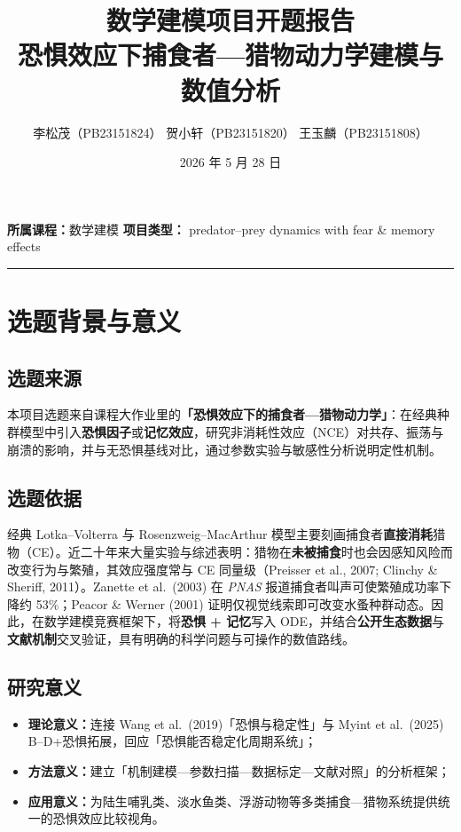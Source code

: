 \documentclass[12pt,a4paper]{ctexart}
\title{\textbf{数学建模项目开题报告}\\[0.4em]
\large 恐惧效应下捕食者—猎物动力学建模与数值分析}
\author{%
  李松茂（PB23151824）\quad
  贺小轩（PB23151820）\quad
  王玉麟（PB23151808）%
}
\date{2026 年 5 月 28 日}
\begin{document}
\maketitle

\begin{center}
\small
\textbf{所属课程：}数学建模 \quad
\textbf{项目类型：} predator--prey dynamics with fear \& memory effects
\end{center}

\vspace{0.5em}
\hrule
\vspace{1em}

\section{选题背景与意义}

\subsection{选题来源}

本项目选题来自课程大作业里的\textbf{「恐惧效应下的捕食者—猎物动力学」}：在经典种群模型中引入\textbf{恐惧因子}或\textbf{记忆效应}，研究非消耗性效应（NCE）对共存、振荡与崩溃的影响，并与无恐惧基线对比，通过参数实验与敏感性分析说明定性机制。

\subsection{选题依据}

经典 Lotka--Volterra 与 Rosenzweig--MacArthur 模型主要刻画捕食者\textbf{直接消耗}猎物（CE）。近二十年来大量实验与综述表明：猎物在\textbf{未被捕食}时也会因感知风险而改变行为与繁殖，其效应强度常与 CE 同量级（Preisser et al., 2007; Clinchy \& Sheriff, 2011）。Zanette et al.\ (2003) 在 \emph{PNAS} 报道捕食者叫声可使繁殖成功率下降约 53\%；Peacor \& Werner (2001) 证明仅视觉线索即可改变水蚤种群动态。因此，在数学建模竞赛框架下，将\textbf{恐惧 + 记忆}写入 ODE，并结合\textbf{公开生态数据}与\textbf{文献机制}交叉验证，具有明确的科学问题与可操作的数值路线。

\subsection{研究意义}

\begin{itemize}[leftmargin=2em]
  \item \textbf{理论意义：}连接 Wang et al.\ (2019)「恐惧与稳定性」与 Myint et al.\ (2025) B--D+恐惧拓展，回应「恐惧能否稳定化周期系统」；
  \item \textbf{方法意义：}建立「机制建模—参数扫描—数据标定—文献对照」的分析框架；
  \item \textbf{应用意义：}为陆生哺乳类、淡水鱼类、浮游动物等多类捕食—猎物系统提供统一的恐惧效应比较视角。
\end{itemize}
\end{document}
